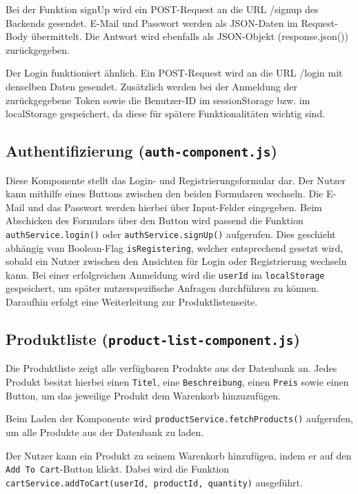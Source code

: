 \documentclass[oneside]{ausarbeitung}
\begin{document}
Bei der Funktion signUp wird ein POST-Request an die URL /signup des Backends gesendet. E-Mail und Passwort werden als JSON-Daten im Request-Body übermittelt. Die Antwort wird ebenfalls als JSON-Objekt (response.json()) zurückgegeben. 

Der Login funktioniert ähnlich. Ein POST-Request wird an die URL /login mit denselben Daten gesendet. Zusätzlich werden bei der Anmeldung der zurückgegebene Token sowie die Benutzer-ID im sessionStorage bzw. im localStorage gespeichert, da diese für spätere Funktionalitäten wichtig sind.

\subsection{Authentifizierung (\texttt{auth-component.js})}

Diese Komponente stellt das Login- und Registrierungsformular dar. Der Nutzer kann mithilfe eines Buttons zwischen den beiden Formularen wechseln. Die E-Mail und das Passwort werden hierbei über Input-Felder eingegeben. Beim Abschicken des Formulars über den Button wird passend die Funktion \texttt{authService.login()} oder \texttt{authService.signUp()} aufgerufen. Dies geschieht abhängig vom Boolean-Flag \texttt{isRegistering}, welcher entsprechend gesetzt wird, sobald ein Nutzer zwischen den Ansichten für Login oder Registrierung wechseln kann. Bei einer erfolgreichen Anmeldung wird die \texttt{userId} im \texttt{localStorage} gespeichert, um später nutzerspezifische Anfragen durchführen zu können. Daraufhin erfolgt eine Weiterleitung zur Produktlistenseite.

\subsection{Produktliste (\texttt{product-list-component.js})}

Die Produktliste zeigt alle verfügbaren Produkte aus der Datenbank an. Jedes Produkt besitzt hierbei einen \texttt{Titel}, eine \texttt{Beschreibung}, einen \texttt{Preis} sowie einen Button, um das jeweilige Produkt dem Warenkorb hinzuzufügen. 

Beim Laden der Komponente wird \texttt{productService.fetchProducts()} aufgerufen, um alle Produkte aus der Datenbank zu laden.

Der Nutzer kann ein Produkt zu seinem Warenkorb hinzufügen, indem er auf den \texttt{Add To Cart}-Button klickt. Dabei wird die Funktion \texttt{cartService.addToCart(userId, productId, quantity)} ausgeführt.
\end{document}
